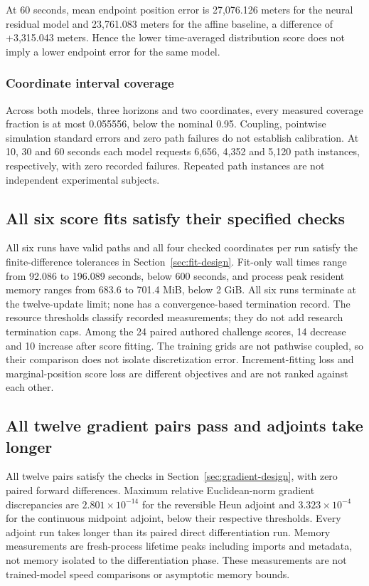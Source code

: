 \documentclass[11pt]{article}
\newcommand{\tabfile}[1]{\begin{center}\resizebox{\textwidth}{!}{}\end{center}}
\begin{document}
\tabfile{fde-mc.tex}
At 60 seconds, mean endpoint position error is 27,076.126 meters for the neural residual model and 23,761.083 meters for the affine baseline, a difference of +3,315.043 meters. Hence the lower time-averaged distribution score does not imply a lower endpoint error for the same model.

\subsubsection{Coordinate interval coverage}
\tabfile{real-calibration.tex}
Across both models, three horizons and two coordinates, every measured coverage fraction is at most 0.055556, below the nominal 0.95. Coupling, pointwise simulation standard errors and zero path failures do not establish calibration. At 10, 30 and 60 seconds each model requests 6,656, 4,352 and 5,120 path instances, respectively, with zero recorded failures. Repeated path instances are not independent experimental subjects.

\subsection{All six score fits satisfy their specified checks}\label{sec:rq3}
\tabfile{o2-feasibility.tex}
All six runs have valid paths and all four checked coordinates per run satisfy the finite-difference tolerances in Section~\ref{sec:fit-design}. Fit-only wall times range from 92.086 to 196.089 seconds, below 600 seconds, and process peak resident memory ranges from 683.6 to 701.4 MiB, below 2 GiB. All six runs terminate at the twelve-update limit; none has a convergence-based termination record. The resource thresholds classify recorded measurements; they do not add research termination caps. Among the 24 paired authored challenge scores, 14 decrease and 10 increase after score fitting. The training grids are not pathwise coupled, so their comparison does not isolate discretization error. Increment-fitting loss and marginal-position score loss are different objectives and are not ranked against each other.

\subsection{All twelve gradient pairs pass and adjoints take longer}\label{sec:gradient-results}
\tabfile{gradient-routes.tex}
All twelve pairs satisfy the checks in Section~\ref{sec:gradient-design}, with zero paired forward differences. Maximum relative Euclidean-norm gradient discrepancies are $2.801\times10^{-14}$ for the reversible Heun adjoint and $3.323\times10^{-4}$ for the continuous midpoint adjoint, below their respective thresholds. Every adjoint run takes longer than its paired direct differentiation run. Memory measurements are fresh-process lifetime peaks including imports and metadata, not memory isolated to the differentiation phase. These measurements are not trained-model speed comparisons or asymptotic memory bounds.
\end{document}
